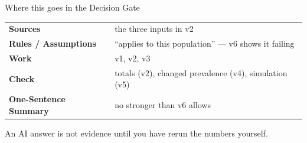 \documentclass[aspectratio=169,10pt]{beamer}
\begin{document}
\begin{frame}{Where this goes in the Decision Gate}
\begin{tabular}{ll}
\textbf{Sources} & the three inputs in v2 \\
\textbf{Rules / Assumptions} & ``applies to this population'' --- v6 shows it failing \\
\textbf{Work} & v1, v2, v3 \\
\textbf{Check} & totals (v2), changed prevalence (v4), simulation (v5) \\
\textbf{One-Sentence Summary} & no stronger than v6 allows \\
\end{tabular}
\vspace{3mm}
An AI answer is not evidence until you have rerun the numbers yourself.
\end{frame}
\end{document}
